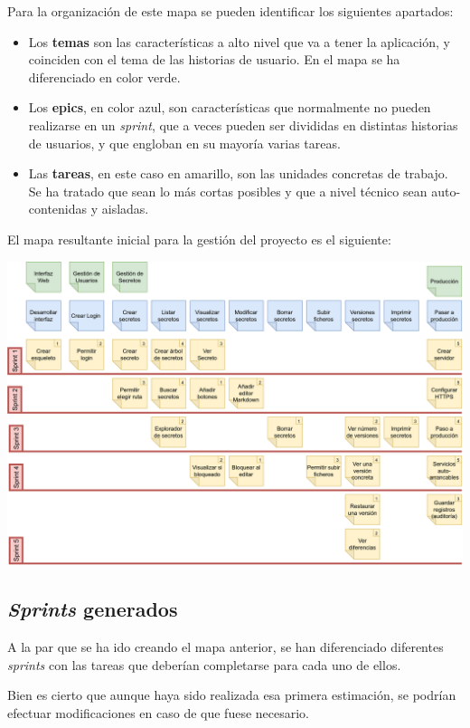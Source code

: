 \documentclass{\ClassPath/viu-tfm-template}
\begin{document}
Para la organización de este mapa se pueden identificar los siguientes apartados:
\begin{itemize}
    \item Los \textbf{temas} son las características a alto nivel que va a tener la aplicación, y coinciden con el tema de las historias de usuario. En el mapa se ha diferenciado en color verde.
    \item Los \textbf{epics}, en color azul, son características que normalmente no pueden realizarse en un \textit{sprint}, que a veces pueden ser divididas en distintas historias de usuarios, y que engloban en su mayoría varias tareas.
    \item Las \textbf{tareas}, en este caso en amarillo, son las unidades concretas de trabajo. Se ha tratado que sean lo más cortas posibles y que a nivel técnico sean auto-contenidas y aisladas.
\end{itemize}

El mapa resultante inicial para la gestión del proyecto es el siguiente:

\begin{center}
    \includegraphics[width=\linewidth]{img/kanban.png}
\end{center}

\subsection{\textit{Sprints} generados}

A la par que se ha ido creando el mapa anterior, se han diferenciado diferentes \textit{sprints} con las tareas que deberían completarse para cada uno de ellos.

Bien es cierto que aunque haya sido realizada esa primera estimación, se podrían efectuar modificaciones en caso de que fuese necesario.
\end{document}
